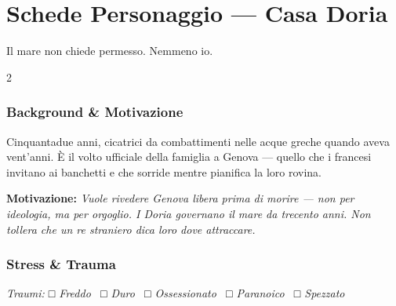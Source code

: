 
\chapter{Schede Personaggio — Casa Doria}
\label{ch:pg-doria}


%
  {Il mare non chiede permesso. Nemmeno io.}

\begin{multicols}{2}

\subsection*{Background \& Motivazione}

Cinquantadue anni, cicatrici da combattimenti nelle acque greche quando aveva vent'anni.
È il volto ufficiale della famiglia a Genova — quello che i francesi invitano
ai banchetti e che sorride mentre pianifica la loro rovina.

\textbf{\textcolor{DoriaBlue}{Motivazione:}} \textit{Vuole rivedere Genova libera prima di
morire — non per ideologia, ma per orgoglio. I Doria governano il mare
da trecento anni. Non tollera che un re straniero dica loro dove attraccare.}

\columnbreak

\subsection*{Stress \& Trauma}
\textit{\small Traumi: □ Freddo \ □ Duro \ □ Ossessionato \ □ Paranoico \ □ Spezzato}

\end{multicols}

